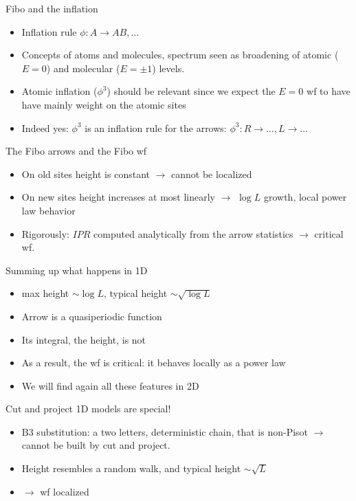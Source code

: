 \documentclass[xcolor=x11names,compress,professionalfonts]{beamer}
\renewcommand{\(}{\begin{columns}}
\renewcommand{\)}{\end{columns}}
\newcommand{\<}[1]{\begin{column}{#1}}
\renewcommand{\>}{\end{column}}
\begin{document}
\begin{frame}{Fibo and the inflation}
\begin{itemize}
	\item Inflation rule $\phi: A \to AB,\dots$
	\item Concepts of atoms and molecules, spectrum seen as broadening of atomic ($E=0$) and molecular ($E = \pm 1$) levels.
	\item Atomic inflation ($\phi^3$) should be relevant since we expect the $E=0$ wf to have have mainly weight on the atomic sites
	\item Indeed yes: $\phi^3$ is an inflation rule for the arrows: $\phi^3: R \to \dots, L \to \dots$
\end{itemize}
\end{frame}

\begin{frame}{The Fibo arrows and the Fibo wf}
\begin{itemize}
	\item On old sites height is constant $\rightarrow$ cannot be localized
	\item On new sites height increases at most linearly $\rightarrow$ $\log L$ growth, local power law behavior
	\item Rigorously: $IPR$ computed analytically from the arrow statistics $\rightarrow$ critical wf.
\end{itemize}
\end{frame}

\begin{frame}{Summing up what happens in 1D}
\begin{itemize}
	\item max height $\sim \log L$, typical height $\sim \sqrt{\log L}$
	\item Arrow is a quasiperiodic function
	\item Its integral, the height, is not
	\item As a result, the wf is critical: it behaves locally as a power law
	\item We will find again all these features in 2D
\end{itemize}
\end{frame}

\begin{frame}{Cut and project 1D models are special!}
\begin{itemize}
	\item B3 substitution: a two letters, deterministic chain, that is non-Pisot $\rightarrow$ cannot be built by cut and project.
	\item Height resembles a random walk, and typical height $\sim \sqrt{L}$
	\item $\rightarrow$ wf localized 
\end{itemize}
\end{frame}
\end{document}

